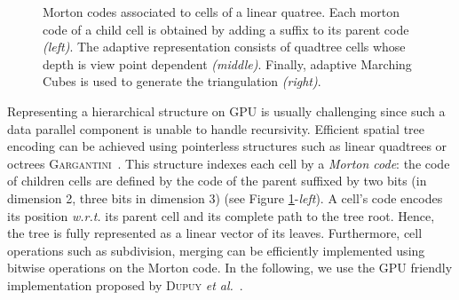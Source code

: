 \documentclass{llncs}
\newcommand{\wrt}{\emph{w.r.t.}\xspace}
\begin{document}
\begin{figure}[!htbp]
  \vspace{-0.35cm}
  \begin{center}
  \end{center}
  \vspace{-0.35cm}
\caption{Morton codes associated to cells of a linear quatree. Each
   morton code of a child cell is obtained by adding a suffix to its
  parent code \emph{(left)}. The adaptive representation consists of
  quadtree cells whose depth is view point dependent
  \emph{(middle)}. Finally, adaptive Marching Cubes is used to
  generate the triangulation \emph{(right)}.}
\label{fig_quadtree_partitionning}
\end{figure}

Representing a hierarchical structure on GPU is usually challenging since
such a data parallel component is unable to handle recursivity.
Efficient spatial tree encoding can be
achieved using pointerless structures such as linear quadtrees or octrees
 \textsc{Gargantini}~\cite{gargantini1982effective}. This structure
indexes each cell by a \emph{Morton code}: the code of children
cells are defined by the code of the parent suffixed by two bits (in dimension
2, three bits in dimension 3) (see Figure
\ref{fig_quadtree_partitionning}-\emph{left}). A cell's code encodes its
position \wrt its parent cell and its complete path to the tree root.
Hence, the tree is fully represented as a linear vector of its leaves.
Furthermore, cell operations such as subdivision, merging %
can be efficiently implemented using bitwise operations on the Morton
code. In the following, we use the GPU
friendly
implementation proposed by \textsc{Dupuy}
\textit{et al.}~\cite{dupuy2014quadtrees}.%
\end{document}
